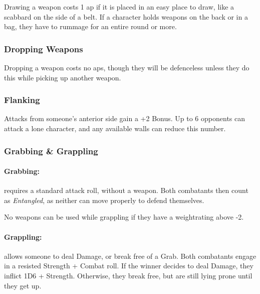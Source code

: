 \begin{multicols}{2}
Drawing a weapon costs 1 \gls{ap} if it is placed in an easy place to draw, like a scabbard on the side of a belt.
If a character holds weapons on the back or in a bag, they have to rummage for an entire round or more.

\subsubsection[Dropping Weapon -- Cost: 0 \gls{ap}]{Dropping Weapons}

Dropping a weapon costs no \glspl{ap}, though they will be defenceless unless they do this while picking up another weapon.

\subsubsection[Flanking: Gain +2 to attack]{Flanking}\label{flank}

Attacks from someone's anterior side gain a +2 Bonus.
Up to 6 opponents can attack a lone character, and any available walls can reduce this number.


\subsubsection{Grabbing \& Grappling}
\label{grappling}

\paragraph[Grabs: Make an attack without any weapon bonus. Both combatants are \textit{Entangled}. Cost: 1 \gls{ap}]{Grabbing:}
requires a standard attack roll, without a weapon.
Both combatants then count as \textit{Entangled}, as neither can move properly to defend themselves.

No weapons can be used while grappling if they have a \gls{weightrating} above -2.

\paragraph[Grapple: Make an opposted roll of Strength + Combat.  Success means the combatant can either break free or inflict Damage.  Cost: 3 \gls{ap}]{Grappling:}
allows someone to deal Damage, or break free of a Grab.
Both combatants engage in a resisted Strength + Combat roll.
If the winner decides to deal Damage, they inflict 1D6 + Strength.
Otherwise, they break free, but are still lying prone until they get up.


\end{multicols}
